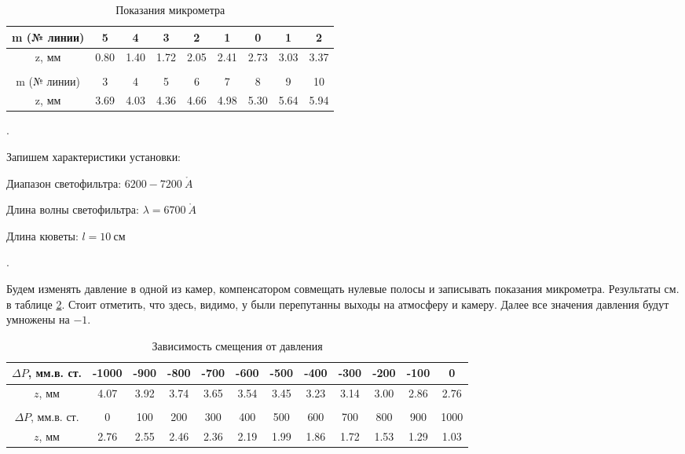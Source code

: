 \documentclass[a4paper, 12pt]{article}
\renewcommand{\AA}{\ensuremath{\mathring{A}}}
\newcounter{Points}
\newcommand{\point}{\arabic{Points}. \addtocounter{Points}{1}}
\begin{document}
\begin{table}[!h]
    \centering
    \begin{tabular}{|c|c|c|c|c|c|c|c|c|}
        \hline
        m (№ линии) & 5 & 4 & 3 & 2 & 1 & 0 & 1 & 2 \\ \hline
        z, мм & 0.80 & 1.40 & 1.72 & 2.05 & 2.41 & 2.73 & 3.03 & 3.37 
        \\ \hline \multicolumn{9}{c}{ } \\ \hline
        m (№ линии) & 3 & 4 & 5 & 6 & 7 & 8 & 9 & 10 \\ \hline
        z, мм & 3.69 & 4.03 & 4.36 & 4.66 & 4.98 & 5.30 & 5.64 & 5.94
        \\ \hline
    \end{tabular}
    \caption {Показания микрометра}
    \label{kalib}
\end{table}

\point Запишем характеристики установки:

Диапазон светофильтра: $6200-7200~\AA$

Длина волны светофильтра: $\lambda = 6700~\AA$

Длина кюветы: $l = 10~см$

\point Будем изменять давление в одной из камер, компенсатором совмещать нулевые полосы и записывать показания микрометра. Результаты см. в таблице \ref{press}. Стоит отметить, что здесь, видимо, у  были перепутанны выходы на атмосферу и камеру. Далее все значения давления будут умножены на $-1$.

\begin{table}[!h]
    \centering
    \begin{tabular}{|c|c|c|c|c|c|c|c|c|c|c|c|}
        \hline
        $\Delta P$, мм.в. ст. & -1000 & -900 & -800 & -700 & -600 & -500 & -400 & -300 & -200 & -100 & 0 \\ \hline
        $z$, мм & 4.07 & 3.92 & 3.74 & 3.65 & 3.54 & 3.45 & 3.23 & 3.14 & 3.00 & 2.86 & 2.76 \\ \hline
        \multicolumn{12}{c}{ } \\ \hline
        $\Delta P$, мм.в. ст. & 0 & 100 & 200 & 300 & 400 & 500 & 600 & 700 & 800 & 900 & 1000 \\ \hline
        $z$, мм & 2.76 & 2.55 & 2.46 & 2.36 & 2.19 & 1.99 & 1.86 & 1.72 & 1.53 & 1.29 & 1.03 \\ \hline
    \end{tabular}
    \caption {Зависимость смещения от давления}
    \label{press}
\end{table}
\end{document}
